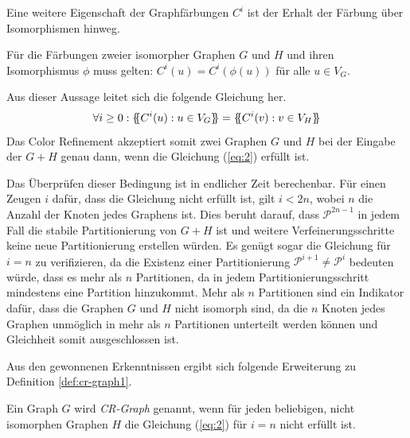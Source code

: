 Eine weitere Eigenschaft der Graphfärbungen $C^i$ ist der Erhalt der Färbung über Isomorphismen hinweg.
\begin{Lemma}
	Für die Färbungen zweier isomorpher Graphen $G$ und $H$ und ihren Isomorphismus $\phi$ muss gelten: $C^i(u)=C^i(\phi (u))$ für alle $u\in V_G$.
	\label{lemma:faerbung_isomorphismus}
\end{Lemma}
Aus dieser Aussage leitet sich die folgende Gleichung her.
\begin{equation}
\forall i\geq 0:\{\mskip-5mu\{ C^i(u):u\in V_G\}\mskip-5mu\} =\{\mskip-5mu\{ C^i(v):v\in V_H\}\mskip-5mu\} 
\label{eq:2}
\end{equation}
Das Color Refinement akzeptiert somit zwei Graphen $G$ und $H$ bei der Eingabe der  $G+H$ genau dann, wenn die Gleichung (\ref{eq:2}) erfüllt ist.

Das Überprüfen dieser Bedingung ist in endlicher Zeit berechenbar.
Für einen Zeugen $i$ dafür, dass die Gleichung nicht erfüllt ist, gilt $i<2n$, wobei $n$ die Anzahl der Knoten jedes Graphens ist.
Dies beruht darauf, dass $\mathcal{P}^{2n-1}$ in jedem Fall die stabile Partitionierung von $G+H$ ist und weitere Verfeinerungsschritte keine neue Partitionierung erstellen würden.
Es genügt sogar die Gleichung für $i=n$ zu verifizieren, da die Existenz einer Partitionierung $\mathcal{P}^{i+1}\neq \mathcal{P}^i$ bedeuten würde, dass es mehr als $n$ Partitionen, da in jedem Partitionierungsschritt mindestens eine Partition hinzukommt.
Mehr als $n$ Partitionen sind ein Indikator dafür, dass die Graphen $G$ und $H$ nicht isomorph sind, da die $n$ Knoten jedes Graphen unmöglich in mehr als $n$ Partitionen unterteilt werden können und Gleichheit somit ausgeschlossen ist.

Aus den gewonnenen Erkenntnissen ergibt sich folgende Erweiterung zu Definition \ref{def:cr-graph1}.
\begin{Definition}
	Ein Graph $G$ wird \emph{CR-Graph} genannt, wenn für jeden beliebigen, nicht isomorphen Graphen $H$ die Gleichung (\ref{eq:2}) für $i=n$ nicht erfüllt ist.
	\label{def:cr-graph2}
\end{Definition}
